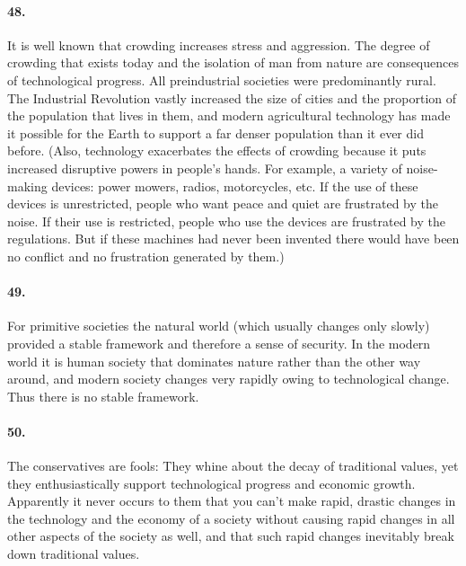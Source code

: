 \documentclass[12pt]{book}
\begin{document}
\paragraph{48.} It is well known that crowding increases stress and aggression. The degree of crowding that exists today and the isolation of man from nature are consequences of technological progress. All preindustrial societies were predominantly rural. The Industrial Revolution vastly increased the size of cities and the proportion of the population that lives in them, and modern agricultural technology has made it possible for the Earth to support a far denser population than it ever did before. (Also, technology exacerbates the effects of crowding because it puts increased disruptive powers in people's hands. For example, a variety of noise-making devices: power mowers, radios, motorcycles, etc. If the use of these devices is unrestricted, people who want peace and quiet are frustrated by the noise. If their use is restricted, people who use the devices are frustrated by the regulations. But if these machines had never been invented there would have been no conflict and no frustration generated by them.)


\paragraph{49.} For primitive societies the natural world (which usually changes only slowly) provided a stable framework and therefore a sense of security.  In the modern world it is human society that dominates nature rather than the other way around, and modern society changes very rapidly owing to technological change. Thus there is no stable framework.


\paragraph{50.} The conservatives are fools: They whine about the decay of traditional values, yet they enthusiastically support technological progress and economic growth. Apparently it never occurs to them that you can't make rapid, drastic changes in the technology and the economy of a society without causing rapid changes in all other aspects of the society as well, and that such rapid changes inevitably break down traditional values.
\end{document}

